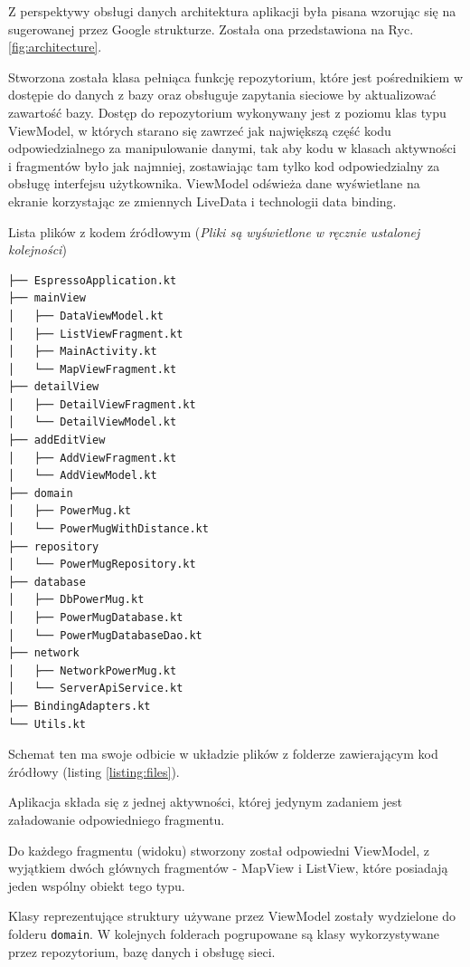 \documentclass[polish,polish,a4paper,12pt]{article}
\begin{document}
		Z perspektywy obsługi danych architektura aplikacji była pisana wzorując się na sugerowanej przez Google strukturze. Została ona przedstawiona na Ryc. \ref{fig:architecture}.

		Stworzona została klasa pełniąca funkcję repozytorium, które jest pośrednikiem w dostępie do danych z bazy oraz obsługuje zapytania sieciowe by aktualizować zawartość bazy. Dostęp do repozytorium wykonywany jest z poziomu klas typu ViewModel, w których starano się zawrzeć jak największą część kodu odpowiedzialnego za manipulowanie danymi, tak aby kodu w klasach aktywności i fragmentów było jak najmniej, zostawiając tam tylko kod odpowiedzialny za obsługę interfejsu użytkownika. ViewModel odświeża dane wyświetlane na ekranie korzystając ze zmiennych LiveData i technologii data binding.

		\begin{listing}[H]
			\caption{Lista plików z kodem źródłowym (\textit{Pliki są wyświetlone w ręcznie ustalonej kolejności})}
			\begin{verbatim}
├── EspressoApplication.kt
├── mainView
│   ├── DataViewModel.kt
│   ├── ListViewFragment.kt
│   ├── MainActivity.kt
│   └── MapViewFragment.kt
├── detailView
│   ├── DetailViewFragment.kt
│   └── DetailViewModel.kt
├── addEditView
│   ├── AddViewFragment.kt
│   └── AddViewModel.kt
├── domain
│   ├── PowerMug.kt
│   └── PowerMugWithDistance.kt
├── repository
│   └── PowerMugRepository.kt
├── database
│   ├── DbPowerMug.kt
│   ├── PowerMugDatabase.kt
│   └── PowerMugDatabaseDao.kt
├── network
│   ├── NetworkPowerMug.kt
│   └── ServerApiService.kt
├── BindingAdapters.kt
└── Utils.kt
			\end{verbatim}
			\label{listing:files}
		\end{listing}

		Schemat ten ma swoje odbicie w układzie plików z folderze zawierającym kod źródłowy (listing \ref{listing:files}).

		Aplikacja składa się z jednej aktywności, której jedynym zadaniem jest załadowanie odpowiedniego fragmentu.

		Do każdego fragmentu (widoku) stworzony został odpowiedni ViewModel, z wyjątkiem dwóch głównych fragmentów - MapView i ListView, które posiadają jeden wspólny obiekt tego typu.

		Klasy reprezentujące struktury używane przez ViewModel zostały wydzielone do folderu \texttt{domain}. W kolejnych folderach pogrupowane są klasy wykorzystywane przez repozytorium, bazę danych i obsługę sieci.
\end{document}

